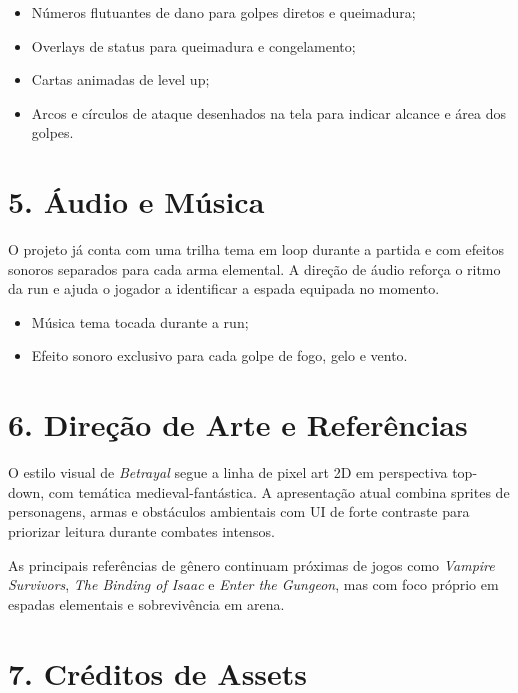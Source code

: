 \documentclass[a4paper,12pt]{article}
\begin{document}
\begin{itemize}
    \item Números flutuantes de dano para golpes diretos e queimadura;
    \item Overlays de status para queimadura e congelamento;
    \item Cartas animadas de level up;
    \item Arcos e círculos de ataque desenhados na tela para indicar alcance e área dos golpes.
\end{itemize}

\pagebreak


\section*{5. Áudio e Música}

O projeto já conta com uma trilha tema em loop durante a partida e com efeitos sonoros separados para cada arma elemental. A direção de áudio reforça o ritmo da run e ajuda o jogador a identificar a espada equipada no momento.

\begin{itemize}
    \item Música tema tocada durante a run;
    \item Efeito sonoro exclusivo para cada golpe de fogo, gelo e vento.
\end{itemize}


\section*{6. Direção de Arte e Referências}

O estilo visual de \textit{Betrayal} segue a linha de pixel art 2D em perspectiva top-down, com temática medieval-fantástica. A apresentação atual combina sprites de personagens, armas e obstáculos ambientais com UI de forte contraste para priorizar leitura durante combates intensos.

As principais referências de gênero continuam próximas de jogos como \textit{Vampire Survivors}, \textit{The Binding of Isaac} e \textit{Enter the Gungeon}, mas com foco próprio em espadas elementais e sobrevivência em arena.


\section*{7. Créditos de Assets}
\end{document}
